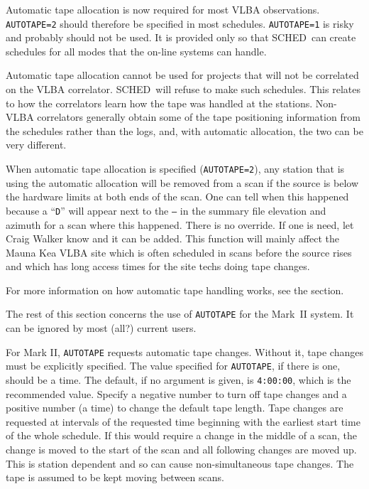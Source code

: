 \documentclass{report}
\newcommand{\schedb}{{\sc SCHED~}}
\begin{document}
Automatic tape allocation is now required for most VLBA observations.
{\tt AUTOTAPE=2} should therefore be specified in most schedules.
{\tt AUTOTAPE=1} is risky and probably should not be used.  It is
provided only so that \schedb can create schedules for all modes
that the on-line systems can handle.

Automatic tape allocation cannot be used for projects that will not
be correlated on the VLBA correlator.  \schedb will refuse to make
such schedules.  This relates to how the correlators learn how the
tape was handled at the stations.  Non-VLBA correlators generally
obtain some of the tape positioning information from the schedules
rather than the logs, and, with automatic allocation, the two
can be very different.

When automatic tape allocation is specified ({\tt AUTOTAPE=2}), any
station that is using the automatic allocation will be removed from a
scan if the source is below the hardware limits at both ends of the
scan.  One can tell when this happened because a ``{\tt D}'' will
appear next to the {\tt ---} in the summary file elevation and azimuth
for a scan where this happened.  There is no override.  If one is
need, let Craig Walker know and it can be added.  This function
will mainly affect the Mauna Kea VLBA site which is often scheduled
in scans before the source rises and which has long access times
for the site techs doing tape changes.

For more information on how automatic tape handling works, see the
 section.

The rest of this section concerns the use of {\tt AUTOTAPE} for
the Mark~II system.  It can be ignored by most (all?) current
users.

For Mark II, {\tt AUTOTAPE} requests automatic tape changes.  Without
it, tape changes must be explicitly specified.  The value specified
for {\tt AUTOTAPE}, if there is one, should be a time.  The default,
if no argument is given, is {\tt 4:00:00}, which is the recommended
value.  Specify a negative number to turn off tape changes and a
positive number (a time) to change the default tape length.  Tape
changes are requested at intervals of the requested time beginning
with the earliest start time of the whole schedule. If this would
require a change in the middle of a scan, the change is moved to the
start of the scan and all following changes are moved up. This is
station dependent and so can cause non-simultaneous tape changes. The
tape is assumed to be kept moving between scans.
\end{document}
